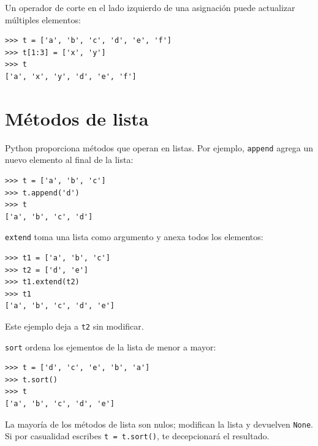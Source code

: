 \documentclass[10pt]{book}
\begin{document}
Un operador de corte en el lado izquierdo de una asignación
puede actualizar múltiples elementos:

\begin{verbatim}
>>> t = ['a', 'b', 'c', 'd', 'e', 'f']
>>> t[1:3] = ['x', 'y']
>>> t
['a', 'x', 'y', 'd', 'e', 'f']
\end{verbatim}
%


%

%


\section{Métodos de lista}

Python proporciona métodos que operan en listas.  Por ejemplo,
{\tt append} agrega un nuevo elemento al final de la lista:

\begin{verbatim}
>>> t = ['a', 'b', 'c']
>>> t.append('d')
>>> t
['a', 'b', 'c', 'd']
\end{verbatim}
%
{\tt extend} toma una lista como argumento y anexa todos
los elementos:

\begin{verbatim}
>>> t1 = ['a', 'b', 'c']
>>> t2 = ['d', 'e']
>>> t1.extend(t2)
>>> t1
['a', 'b', 'c', 'd', 'e']
\end{verbatim}
%
Este ejemplo deja a {\tt t2} sin modificar.

{\tt sort} ordena los ejementos de la lista de menor a mayor:

\begin{verbatim}
>>> t = ['d', 'c', 'e', 'b', 'a']
>>> t.sort()
>>> t
['a', 'b', 'c', 'd', 'e']
\end{verbatim}
%
La mayoría de los métodos de lista son nulos; modifican la lista y devuelven {\tt None}.
Si por casualidad escribes {\tt t = t.sort()}, te decepcionará
el resultado.
\end{document}
